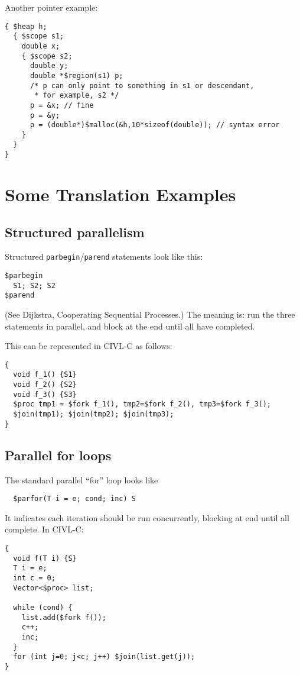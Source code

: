 \documentclass[11pt]{article}
\begin{document}
Another pointer example:
\begin{verbatim}
{ $heap h;
  { $scope s1;
    double x;
    { $scope s2;
      double y;
      double *$region(s1) p;
      /* p can only point to something in s1 or descendant,
       * for example, s2 */
      p = &x; // fine
      p = &y;
      p = (double*)$malloc(&h,10*sizeof(double)); // syntax error
    }
  }
}
\end{verbatim}

\section{Some Translation Examples}

\subsection{Structured parallelism}
Structured \verb!parbegin!/\verb!parend! statements look like this:
\begin{verbatim}
$parbegin
  S1; S2; S2
$parend
\end{verbatim}
(See Dijkstra, Cooperating Sequential Processes.)  The meaning is: run
the three statements in parallel, and block at the end until all have
completed.

This can be represented in CIVL-C as follows:

\begin{verbatim}
{
  void f_1() {S1}
  void f_2() {S2}
  void f_3() {S3}
  $proc tmp1 = $fork f_1(), tmp2=$fork f_2(), tmp3=$fork f_3();
  $join(tmp1); $join(tmp2); $join(tmp3);
}
\end{verbatim}

\subsection{Parallel for loops}
The standard parallel ``for'' loop looks like
\begin{verbatim}
  $parfor(T i = e; cond; inc) S
\end{verbatim}
It indicates each iteration should be run concurrently, blocking
at end until all complete.  In CIVL-C:

\begin{verbatim}
{
  void f(T i) {S}
  T i = e;
  int c = 0;
  Vector<$proc> list;

  while (cond) {
    list.add($fork f());
    c++;
    inc;
  }
  for (int j=0; j<c; j++) $join(list.get(j));
}
\end{verbatim}
\end{document}
